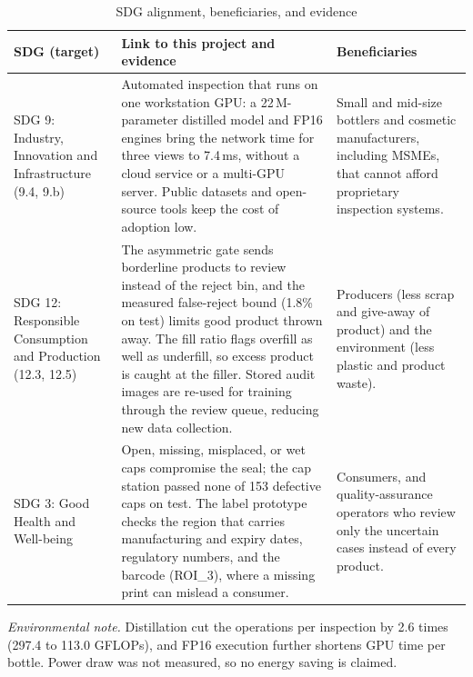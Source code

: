 \begin{table}[htbp]
\centering
\caption{SDG alignment, beneficiaries, and evidence}
\label{tab:sdg}
\begin{tabularx}{\textwidth}{|L{2.8cm}|X|L{3.2cm}|}
\hline
\textbf{SDG (target)} & \textbf{Link to this project and evidence} & \textbf{Beneficiaries} \\ \hline
SDG 9: Industry, Innovation and Infrastructure (9.4, 9.b) & Automated inspection that runs on one workstation GPU: a 22\,M-parameter distilled model and FP16 engines bring the network time for three views to 7.4\,ms, without a cloud service or a multi-GPU server. Public datasets and open-source tools keep the cost of adoption low. & Small and mid-size bottlers and cosmetic manufacturers, including MSMEs, that cannot afford proprietary inspection systems. \\ \hline
SDG 12: Responsible Consumption and Production (12.3, 12.5) & The asymmetric gate sends borderline products to review instead of the reject bin, and the measured false-reject bound (1.8\% on test) limits good product thrown away. The fill ratio flags overfill as well as underfill, so excess product is caught at the filler. Stored audit images are re-used for training through the review queue, reducing new data collection. & Producers (less scrap and give-away of product) and the environment (less plastic and product waste). \\ \hline
SDG 3: Good Health and Well-being & Open, missing, misplaced, or wet caps compromise the seal; the cap station passed none of 153 defective caps on test. The label prototype checks the region that carries manufacturing and expiry dates, regulatory numbers, and the barcode (ROI\_3), where a missing print can mislead a consumer. & Consumers, and quality-assurance operators who review only the uncertain cases instead of every product. \\ \hline
\end{tabularx}
\end{table}

\noindent\textit{Environmental note.} Distillation cut the operations per inspection by 2.6 times (297.4 to 113.0 GFLOPs), and FP16 execution further shortens GPU time per bottle. Power draw was not measured, so no energy saving is claimed.
